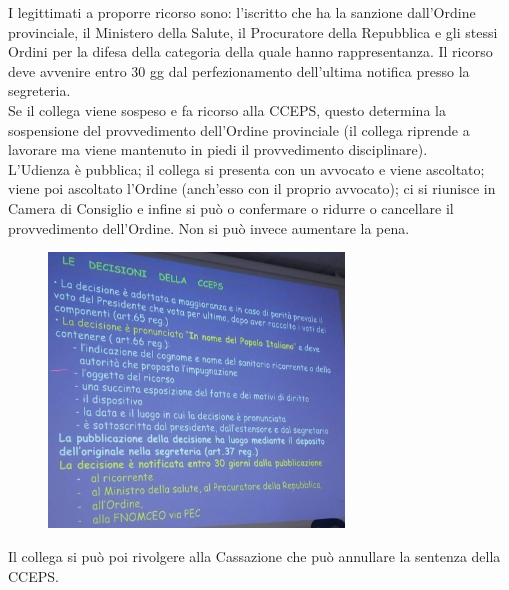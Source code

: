 I legittimati a proporre ricorso sono: l'iscritto che ha la sanzione
dall'Ordine provinciale, il Ministero della Salute, il Procuratore della
Repubblica e gli stessi Ordini per la difesa della categoria della quale
hanno rappresentanza. Il ricorso deve avvenire entro 30 gg dal
perfezionamento dell'ultima notifica presso la segreteria.
\\
Se il collega viene sospeso e fa ricorso alla CCEPS, questo determina la
sospensione del provvedimento dell'Ordine provinciale (il collega
riprende a lavorare ma viene mantenuto in piedi il provvedimento
disciplinare).
\\
L'Udienza è pubblica; il collega si presenta con un avvocato e viene
ascoltato; viene poi ascoltato l'Ordine (anch'esso con il proprio
avvocato); ci si riunisce in Camera di Consiglio e infine si può o
confermare o ridurre o cancellare il provvedimento dell'Ordine. Non si
può invece aumentare la pena.
\begin{figure}[!ht]
\centering
	\includegraphics[width=0.7\textwidth]{34/image21.jpeg}
	\end{figure}

Il collega si può poi rivolgere alla Cassazione che può annullare la
sentenza della CCEPS.



